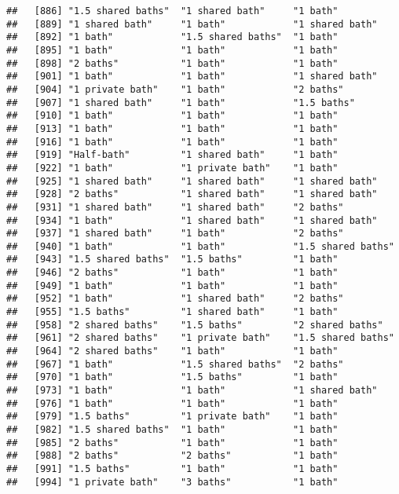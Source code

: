 \documentclass[
]{article}
\begin{document}
\begin{verbatim}
##   [886] "1.5 shared baths"  "1 shared bath"     "1 bath"           
##   [889] "1 shared bath"     "1 bath"            "1 shared bath"    
##   [892] "1 bath"            "1.5 shared baths"  "1 bath"           
##   [895] "1 bath"            "1 bath"            "1 bath"           
##   [898] "2 baths"           "1 bath"            "1 bath"           
##   [901] "1 bath"            "1 bath"            "1 shared bath"    
##   [904] "1 private bath"    "1 bath"            "2 baths"          
##   [907] "1 shared bath"     "1 bath"            "1.5 baths"        
##   [910] "1 bath"            "1 bath"            "1 bath"           
##   [913] "1 bath"            "1 bath"            "1 bath"           
##   [916] "1 bath"            "1 bath"            "1 bath"           
##   [919] "Half-bath"         "1 shared bath"     "1 bath"           
##   [922] "1 bath"            "1 private bath"    "1 bath"           
##   [925] "1 shared bath"     "1 shared bath"     "1 shared bath"    
##   [928] "2 baths"           "1 shared bath"     "1 shared bath"    
##   [931] "1 shared bath"     "1 shared bath"     "2 baths"          
##   [934] "1 bath"            "1 shared bath"     "1 shared bath"    
##   [937] "1 shared bath"     "1 bath"            "2 baths"          
##   [940] "1 bath"            "1 bath"            "1.5 shared baths" 
##   [943] "1.5 shared baths"  "1.5 baths"         "1 bath"           
##   [946] "2 baths"           "1 bath"            "1 bath"           
##   [949] "1 bath"            "1 bath"            "1 bath"           
##   [952] "1 bath"            "1 shared bath"     "2 baths"          
##   [955] "1.5 baths"         "1 shared bath"     "1 bath"           
##   [958] "2 shared baths"    "1.5 baths"         "2 shared baths"   
##   [961] "2 shared baths"    "1 private bath"    "1.5 shared baths" 
##   [964] "2 shared baths"    "1 bath"            "1 bath"           
##   [967] "1 bath"            "1.5 shared baths"  "2 baths"          
##   [970] "1 bath"            "1.5 baths"         "1 bath"           
##   [973] "1 bath"            "1 bath"            "1 shared bath"    
##   [976] "1 bath"            "1 bath"            "1 bath"           
##   [979] "1.5 baths"         "1 private bath"    "1 bath"           
##   [982] "1.5 shared baths"  "1 bath"            "1 bath"           
##   [985] "2 baths"           "1 bath"            "1 bath"           
##   [988] "2 baths"           "2 baths"           "1 bath"           
##   [991] "1.5 baths"         "1 bath"            "1 bath"           
##   [994] "1 private bath"    "3 baths"           "1 bath"           

\end{verbatim}
\end{document}
